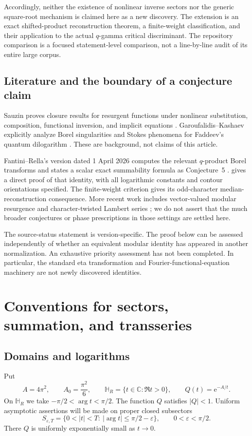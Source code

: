 \documentclass[11pt,a4paper]{article}
\numberwithin{equation}{section}
\theoremstyle{definition}
\theoremstyle{remark}
\newcommand{\C}{\mathbb C}
\newcommand{\e}{\mathrm e}
\newcommand{\eps}{\varepsilon}
\begin{document}
Accordingly, neither the existence of nonlinear inverse sectors nor the generic square-root mechanism is claimed here as a new discovery. The extension is an exact shifted-product reconstruction theorem, a finite-weight classification, and their application to the actual $q$-gamma critical discriminant. The repository comparison is a focused statement-level comparison, not a line-by-line audit of its entire large corpus.

\subsection{Literature and the boundary of a conjecture claim}
Sauzin proves closure results for resurgent functions under nonlinear substitution, composition, functional inversion, and implicit equations \cite{sauzin}. Garoufalidis--Kashaev explicitly analyze Borel singularities and Stokes phenomena for Faddeev's quantum dilogarithm \cite{gk}. These are background, not claims of this article.

Fantini--Rella's version dated 1 April 2026 computes the relevant $q$-product Borel transforms and states a scalar exact summability formula as Conjecture~5 \cite{fr}.  gives a direct proof of that identity, with all logarithmic constants and contour orientations specified. The finite-weight criterion gives its odd-character median-reconstruction consequence. More recent work includes vector-valued modular resurgence and character-twisted Lambert series \cite{vectors,bd}; we do not assert that the much broader conjectures or phase prescriptions in those settings are settled here.

The source-status statement is version-specific. The proof below can be assessed independently of whether an equivalent modular identity has appeared in another normalization. An exhaustive priority assessment has not been completed. In particular, the standard eta transformation and Fourier-functional-equation machinery are not newly discovered identities.

\section{Conventions for sectors, summation, and transseries}
\label{sec:conventions}

\subsection{Domains and logarithms}
Put
\begin{equation}
 A=4\pi^2,\qquad A_0=\frac{\pi^2}{6},\qquad
 \mathbb H_R=\{t\in\C:\Re t>0\},\qquad Q(t)=\e^{-A/t}.
 \label{eq:constants}
\end{equation}
On $\mathbb H_R$ we take $-\pi/2<\arg t<\pi/2$. The function $Q$ satisfies $|Q|<1$. Uniform asymptotic assertions will be made on proper closed subsectors
\begin{equation}
 S_{\eps,T}=\{0<|t|<T:\ |\arg t|\leq\pi/2-\eps\},
 \qquad 0<\eps<\pi/2.
 \label{eq:sector}
\end{equation}
There $Q$ is uniformly exponentially small as $t\to0$.
\end{document}
